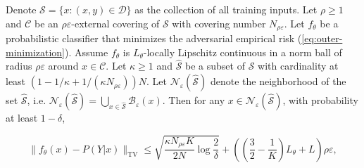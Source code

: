 \begin{lemma}%
\label{lemma:Learn-true-distribution}
Denote $\mathcal{S} = \{x: (x,y)\in \mathcal{D}\}$ as the collection of all training inputs.
Let $\rho\ge 1$ and $\mathcal{C}$ be an $\rho\varepsilon$-external covering of $\mathcal{S}$ with covering number $N_{\rho\varepsilon}$.
Let $f_\theta$ be a probabilistic classifier that minimizes the adversarial empirical risk (\ref{eq:outer-minimization}).
Assume $f_\theta$ is $L_\theta$-locally Lipschitz continuous in a norm ball of radius $\rho\varepsilon$ around $x \in \mathcal{C}$.
Let $\kappa \ge 1$ and $ \mathcal{\hat{S}}$ be a subset of $\mathcal{S}$ with cardinality at least $(1 - 1/\kappa + 1/(\kappa N_{\rho\varepsilon})) N$.
Let $\mathcal{N}_\varepsilon(\mathcal{\hat{S}})$ denote the neighborhood of the set $\mathcal{\hat{S}}$, i.e. $\mathcal{N}_\varepsilon(\mathcal{\hat{S}}) = \bigcup_{x\in\mathcal{\hat{S}}} \mathcal{B}_\varepsilon (x)$. 
Then for any $x \in \mathcal{N}_\varepsilon(\mathcal{\hat{S}})$, with probability at least $1-\delta$,
 
\begin{equation}
    \label{eq:main-theorem-bound}
    \|f_\theta(x) - P(Y|x)\|_{\text{TV}} \le \sqrt{\frac{\kappa N_{\rho\varepsilon} K}{2N}\log\frac{2}{\delta}}  + \left(\left(\frac{3}{2} - \frac{1}{K}\right) L_\theta + L\right) \rho \varepsilon,
\end{equation}


\end{lemma}
